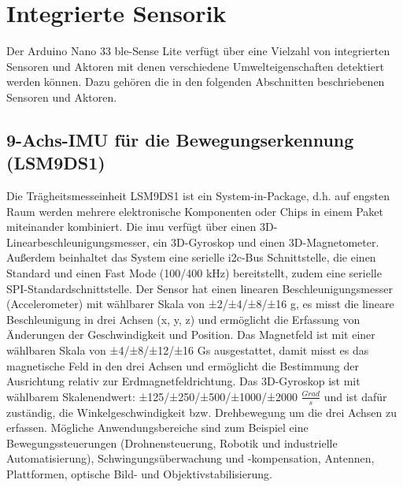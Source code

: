 \section{Integrierte Sensorik}
Der Arduino Nano 33 \ac{ble}-Sense Lite verfügt über eine Vielzahl von integrierten Sensoren und Aktoren mit denen verschiedene Umwelteigenschaften detektiert werden können. Dazu gehören die in den folgenden Abschnitten beschriebenen Sensoren und Aktoren.

\subsection{9-Achs-IMU für die Bewegungserkennung (LSM9DS1)}\label{9Achs}
Die Trägheitsmesseinheit LSM9DS1 ist ein System-in-Package, d.h. auf engsten Raum werden mehrere elektronische Komponenten oder Chips in einem Paket miteinander kombiniert.\cite{Lienig.2012} Die \ac{imu} verfügt über einen 3D-Linearbeschleunigungsmesser, ein 3D-Gyroskop und einen 3D-Magnetometer. Außerdem beinhaltet das System eine serielle \ac{i2c}-Bus Schnittstelle, die einen Standard und einen Fast Mode (100/400 kHz) bereitstellt, zudem eine serielle SPI-Standardschnittstelle. Der Sensor hat einen linearen Beschleunigungsmesser (Accelerometer) mit wählbarer Skala von ±2/±4/±8/±16 g, es misst die lineare Beschleunigung in drei Achsen (x, y, z) und ermöglicht die Erfassung von Änderungen der Geschwindigkeit und Position. Das Magnetfeld ist mit einer wählbaren Skala von ±4/±8/±12/±16 Gs ausgestattet, damit misst es das magnetische Feld in den drei Achsen und ermöglicht die Bestimmung der Ausrichtung relativ zur Erdmagnetfeldrichtung. Das 3D-Gyroskop ist mit wählbarem Skalenendwert: ±125/±250/±500/±1000/±2000 $\frac{Grad}{s}$ und ist dafür zuständig, die Winkelgeschwindigkeit bzw. Drehbewegung um die drei Achsen zu erfassen.\cite{STM1.2015}\cite{Ard.2024}
Mögliche Anwendungsbereiche sind zum Beispiel eine Bewegungssteuerungen (Drohnensteuerung, Robotik und industrielle Automatisierung), Schwingungsüberwachung und -kompensation, Antennen, Plattformen, optische Bild- und Objektivstabilisierung.  

